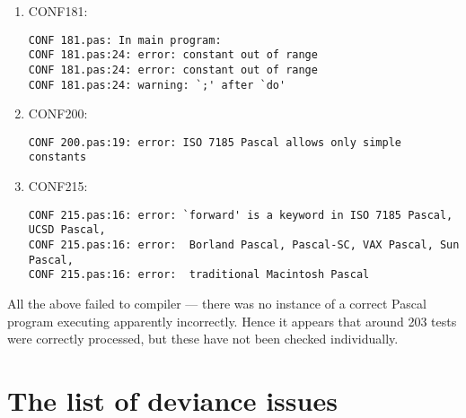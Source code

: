 \documentclass[a4paper]{article}
\begin{document}
\begin{enumerate}
    \item CONF181:
        \begin{small}\begin{verbatim}
CONF 181.pas: In main program:
CONF 181.pas:24: error: constant out of range
CONF 181.pas:24: error: constant out of range
CONF 181.pas:24: warning: `;' after `do'
        \end{verbatim}\end{small}

    \item CONF200:
        \begin{small}\begin{verbatim}
CONF 200.pas:19: error: ISO 7185 Pascal allows only simple constants
        \end{verbatim}\end{small}

    \item CONF215:
        \begin{small}\begin{verbatim}
CONF 215.pas:16: error: `forward' is a keyword in ISO 7185 Pascal, UCSD Pascal,
CONF 215.pas:16: error:  Borland Pascal, Pascal-SC, VAX Pascal, Sun Pascal,
CONF 215.pas:16: error:  traditional Macintosh Pascal
        \end{verbatim}\end{small}

\end{enumerate}

All the above failed to compiler --- there was no instance of a correct Pascal
program executing apparently incorrectly. Hence it appears that around 203
tests were correctly processed, but these have not been checked individually.

\section{The list of deviance issues}
\end{document}
